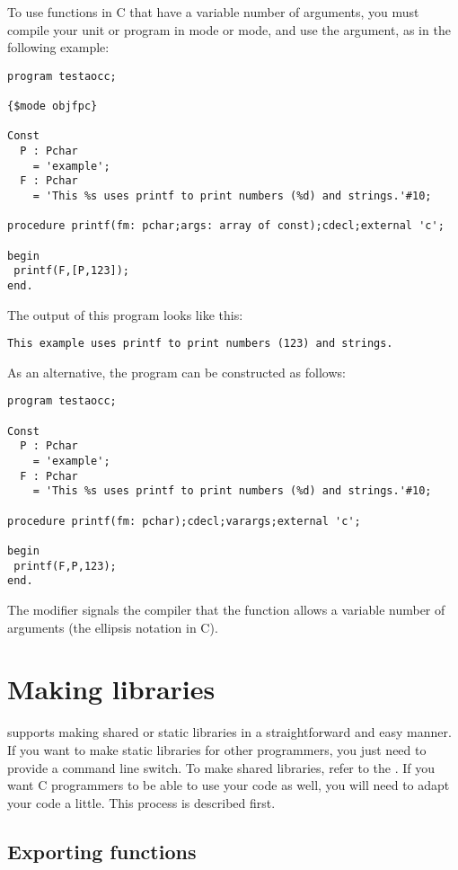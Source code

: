 To use functions in C that have a variable number of arguments, you must
compile your unit or program in  mode or  mode,
and use the  argument, as in the following example:

\begin{verbatim}
program testaocc;

{$mode objfpc}

Const
  P : Pchar
    = 'example';
  F : Pchar
    = 'This %s uses printf to print numbers (%d) and strings.'#10;

procedure printf(fm: pchar;args: array of const);cdecl;external 'c';

begin
 printf(F,[P,123]);
end.
\end{verbatim}
The output of this program looks like this:
\begin{verbatim}
This example uses printf to print numbers (123) and strings.
\end{verbatim}
As an alternative, the program can be constructed as follows:
\begin{verbatim}
program testaocc;

Const
  P : Pchar
    = 'example';
  F : Pchar
    = 'This %s uses printf to print numbers (%d) and strings.'#10;

procedure printf(fm: pchar);cdecl;varargs;external 'c';

begin
 printf(F,P,123);
end.
\end{verbatim}
The  modifier signals the compiler that the function allows
a variable number of arguments (the ellipsis notation in C).
\section{Making libraries}
\label{se:StaticLib}

\fpc supports making shared or static libraries in a straightforward and
easy manner. If you want to make static libraries for other \fpc programmers,
you just need to provide a command line switch. To make shared libraries,
refer to the . If you want C programmers to be able to use your
code as well, you will need to adapt your code a little. This process
is described first.

\subsection{Exporting functions}

